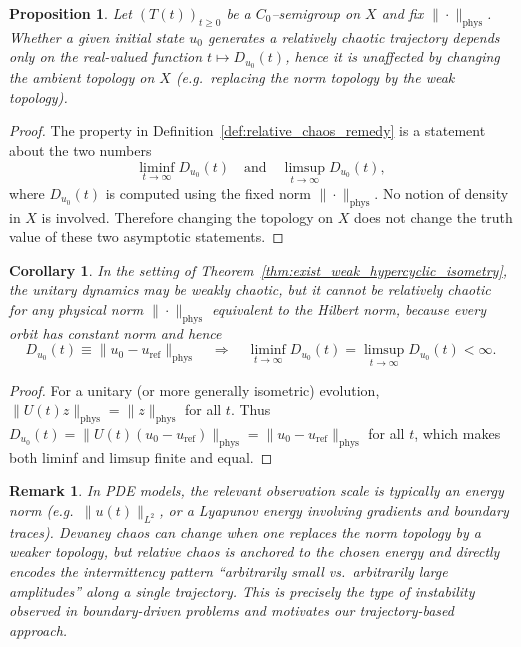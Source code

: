\documentclass[12pt]{article}
\newtheorem{proposition}[theorem]{Proposition}
\newtheorem{remark}[theorem]{Remark}
\newtheorem{corollary}[theorem]{Corollary}
\begin{document}
\begin{proposition}\label{prop:relative_topology_independent}
Let $(T(t))_{t\ge 0}$ be a $C_0$--semigroup on $X$ and fix $\|\cdot\|_{\mathrm{phys}}$. Whether a given initial state $u_0$ generates a relatively chaotic trajectory depends only on the real-valued function $t\mapsto D_{u_0}(t)$, hence it is unaffected by changing the ambient topology on $X$ (e.g.\ replacing the norm topology by the weak topology).
\end{proposition}

\begin{proof}
The property in Definition~\ref{def:relative_chaos_remedy} is a statement about the two numbers
\[
\liminf_{t\to\infty} D_{u_0}(t)
\quad\text{and}\quad
\limsup_{t\to\infty} D_{u_0}(t),
\]
where $D_{u_0}(t)$ is computed using the fixed norm $\|\cdot\|_{\mathrm{phys}}$. No notion of density in $X$ is involved. Therefore changing the topology on $X$ does not change the truth value of these two asymptotic statements.
\end{proof}

\begin{corollary}
\label{cor:weak_devaney_not_physical}
In the setting of Theorem~\ref{thm:exist_weak_hypercyclic_isometry}, the unitary dynamics may be weakly chaotic, but it cannot be relatively chaotic for any physical norm $\|\cdot\|_{\mathrm{phys}}$ equivalent to the Hilbert norm, because every orbit has constant norm and hence 
\[
D_{u_0}(t)\equiv \|u_0-u_{\mathrm{ref}}\|_{\mathrm{phys}} \quad\Rightarrow\quad
\liminf_{t\to\infty}D_{u_0}(t)=\limsup_{t\to\infty}D_{u_0}(t)<\infty.
\]
\end{corollary}

\begin{proof}
For a unitary (or more generally isometric) evolution, $\|U(t)z\|_{\mathrm{phys}}=\|z\|_{\mathrm{phys}}$ for all $t$. Thus $D_{u_0}(t)=\|U(t)(u_0-u_{\mathrm{ref}})\|_{\mathrm{phys}}=\|u_0-u_{\mathrm{ref}}\|_{\mathrm{phys}}$ for all $t$, which makes both liminf and limsup finite and equal.
\end{proof}

\begin{remark}
In PDE models, the relevant observation scale is typically an energy norm (e.g.\ $\|u(t)\|_{L^2}$, or a Lyapunov energy involving gradients and boundary traces). Devaney chaos can change when one replaces the norm topology by a weaker topology, but relative chaos is \emph{anchored} to the chosen energy and directly encodes the intermittency pattern ``arbitrarily small vs.\ arbitrarily large amplitudes'' along a single trajectory. This is precisely the type of instability observed in boundary-driven problems and motivates
our trajectory-based approach.
\end{remark}
\end{document}
